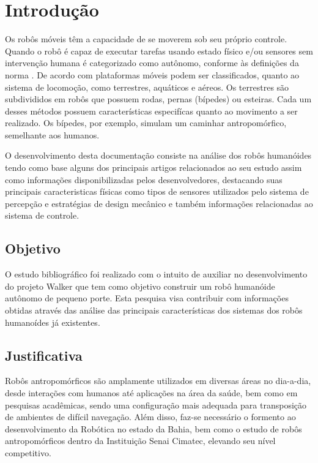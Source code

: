 \chapter{Introdução}
\label{chap:intro}

Os robôs móveis têm a capacidade de se moverem sob seu próprio controle. Quando o robô é capaz de executar tarefas usando estado físico e/ou sensores sem intervenção humana é categorizado como autônomo, conforme às definições da norma \cite{ISO}. De acordo com \cite{Rubio} plataformas móveis podem ser classificados, quanto ao sistema de locomoção, como terrestres, aquáticos e aéreos. Os terrestres são subdivididos em robôs que possuem rodas, pernas (bípedes) ou esteiras. Cada um desses métodos possuem características especifícas quanto ao movimento a ser realizado. Os bípedes, por exemplo, simulam um caminhar antropomórfico, semelhante aos humanos. 

O desenvolvimento desta documentação consiste na análise dos robôs humanóides tendo como base alguns dos principais artigos relacionados ao seu estudo assim como informações disponibilizadas pelos desenvolvedores, destacando suas principais caracteristicas físicas como tipos de sensores utilizados pelo sistema de percepção e estratégias de design mecânico e também informações relacionadas ao sistema de controle.

\section{Objetivo}
\label{sec:obj}

O estudo bibliográfico foi realizado com o intuito de auxiliar no desenvolvimento do projeto Walker que tem como objetivo construir um robô humanóide autônomo de pequeno porte. Esta pesquisa visa contribuir com informações obtidas através das análise das principais características dos sistemas dos robôs humanoídes já existentes. 

\section{Justificativa}
\label{sec:justi}

Robôs antropomórficos são amplamente utilizados em diversas áreas no dia-a-dia, desde interações com humanos até aplicações na área da saúde, bem como em pesquisas acadêmicas, sendo uma configuração mais adequada para transposição de ambientes de difícil navegação.
Além disso, faz-se necessário o formento ao desenvolvimento da Robótica no estado da Bahia, bem como o estudo de robôs antropomórficos dentro da Instituição Senai Cimatec, elevando seu nível competitivo.


